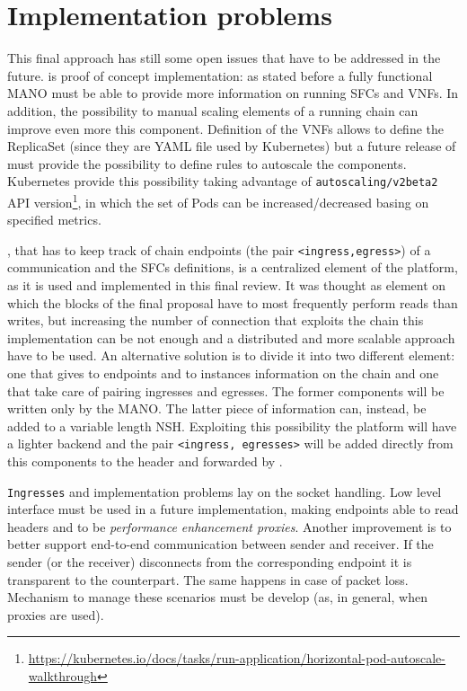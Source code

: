 \section{Implementation problems} \label{chap:impl:sec:problems}
This final approach has still some open issues that have to be addressed in the
future. \harbor{} is proof of concept
implementation: as stated before a fully functional MANO must be able to provide
more information on running SFCs and VNFs. In addition, the possibility to
manual scaling elements of a running chain can improve even more this component.
Definition of the VNFs allows to define the ReplicaSet (since they are YAML
file used by Kubernetes) but a future release of \harbor{} must provide
the possibility to define rules to autoscale the components. Kubernetes
provide this possibility taking advantage of \texttt{autoscaling/v2beta2} API
version\footnote{\sloppy\url{https://kubernetes.io/docs/tasks/run-application/horizontal-pod-autoscale-walkthrough}},
in which the set of Pods can be increased/decreased basing on specified metrics.

\roulette{}, that has to keep track of chain endpoints (the pair 
\verb!<ingress,egress>!) of a communication and the SFCs definitions, is
a centralized element of the platform, as it is used and implemented in this
final review. It was thought as element on which the blocks of the final
proposal have to most frequently perform reads than writes, but increasing the
number of connection that exploits the chain this implementation can be not
enough and a distributed and more scalable approach have to be used. An
alternative solution is to divide it into two different element: one that gives
to endpoints and to \astaire{} instances information on the chain and one that
take care of pairing ingresses and egresses. The former components will be
written only by the MANO. The latter piece of information can, instead, be added
to a variable length NSH. Exploiting this possibility the platform will have a
lighter backend and the pair \verb!<ingress, egresses>! will be added
directly from this components to the header and forwarded by \astaire{}.

\texttt{Ingresses} and \egresses{} implementation problems lay on the socket
handling. Low level interface must be used in a future implementation, making
endpoints able to read headers and to be \emph{performance enhancement proxies}.
Another improvement is to better support end-to-end communication between sender
and receiver. If the sender (or the receiver) disconnects from the corresponding
endpoint it is transparent to the counterpart. The same happens in case of
packet loss. Mechanism to manage these scenarios must be develop (as, in
general, when proxies are used).


